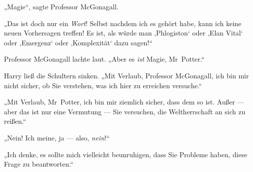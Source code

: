 „Magie“, sagte Professor McGonagall.

„Das ist doch nur ein \emph{Wort}! Selbst nachdem ich es gehört habe, kann ich keine neuen Vorhersagen treffen! Es ist, als würde man ‚Phlogiston‘ oder ‚Elan Vital‘ oder ‚Emergenz‘ oder ‚Komplexität‘ dazu sagen!“

Professor McGonagall lachte laut.
„Aber es \emph{ist} Magie, Mr~Potter.“

Harry ließ die Schultern sinken.
„Mit Verlaub, Professor McGonagall, ich bin mir nicht sicher, ob Sie verstehen, was ich hier zu erreichen versuche.“

„Mit Verlaub, Mr~Potter, ich bin mir ziemlich sicher, dass dem so ist. Außer — aber das ist nur eine Vermutung — Sie versuchen, die Weltherrschaft an sich zu reißen.“

„Nein! Ich meine, ja — also, \emph{nein}!“

„Ich denke, es sollte mich vielleicht beunruhigen, dass Sie Probleme haben, diese Frage zu beantworten.“

